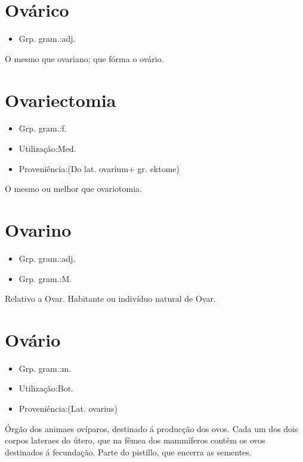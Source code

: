 \section{Ovárico}
\begin{itemize}
\item {Grp. gram.:adj.}
\end{itemize}
O mesmo que \textunderscore ovariano\textunderscore ; que fórma o ovário.
\section{Ovariectomia}
\begin{itemize}
\item {Grp. gram.:f.}
\end{itemize}
\begin{itemize}
\item {Utilização:Med.}
\end{itemize}
\begin{itemize}
\item {Proveniência:(Do lat. \textunderscore ovarium\textunderscore  + gr. \textunderscore ektome\textunderscore )}
\end{itemize}
O mesmo ou melhor que \textunderscore ovariotomia\textunderscore .
\section{Ovarino}
\begin{itemize}
\item {Grp. gram.:adj.}
\end{itemize}
\begin{itemize}
\item {Grp. gram.:M.}
\end{itemize}
Relativo a Ovar.
Habitante ou indivíduo natural de Ovar.
\section{Ovário}
\begin{itemize}
\item {Grp. gram.:m.}
\end{itemize}
\begin{itemize}
\item {Utilização:Bot.}
\end{itemize}
\begin{itemize}
\item {Proveniência:(Lat. \textunderscore ovarius\textunderscore )}
\end{itemize}
Órgão dos animaes ovíparos, destinado á producção dos ovos.
Cada um dos dois corpos lateraes do útero, que na fêmea dos mammíferos contém os ovos destinados á fecundação.
Parte do pistillo, que encerra as sementes.
